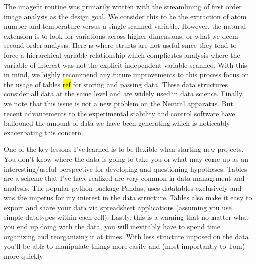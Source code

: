 The imagefit routine was primarily written with the streamlining of first order image analysis as the design goal.
We consider this to be the extraction of atom number and temperature versus a single scanned variable.
However, the natural extension is to look for variations across higher dimensions, or what we deem second order analysis.
Here is where structs are not useful since they tend to force a hierarchical variable relationship which complicates analysis where the variable of interest was not the explicit independent variable scanned.
With this in mind, we highly recommend any future improvements to this process focus on the usage of tables \hl{ref} for storing and passing data.
These data structures consider all data at the same level and are widely used in data science.
Finally, we note that this issue is not a new problem on the Neutral apparatus. 
But recent advancements to the experimental stability and control software have ballooned the amount of data we have been generating which is noticeably exacerbating this concern.

One of the key lessons I've learned is to be flexible when starting new projects. 
You don't know where the data is going to take you or what may come up as an interesting/useful perspective for developing and questioning hypotheses. 
Tables are a scheme that I've have realized are very common in data management and analysis. 
The popular python package Pandas, uses datatables exclusively and was the impetus for my interest in the data structure. 
Tables also make it easy to export and share your data via spreadsheet applications (assuming you use simple datatypes within each cell).
Lastly, this is a warning that no matter what you end up doing with the data, you will inevitably have to spend time organizing and reorganizing it at times. 
With less structure imposed on the data you'll be able to manipulate things more easily and (most importantly to Tom) more quickly.
